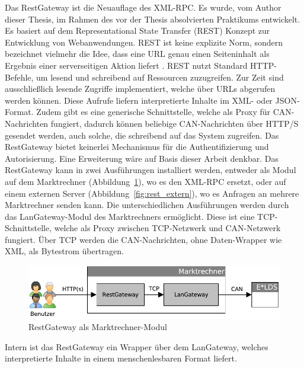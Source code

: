 \documentclass[11pt,a4paper]{report}
\begin{document}
Das RestGateway ist die Neuauflage des XML-RPC. Es wurde, vom Author dieser Thesis, im Rahmen des vor der Thesis absolvierten Praktikums entwickelt. Es basiert auf dem Representational State Transfer (REST) Konzept zur Entwicklung von Webanwendungen. REST ist keine explizite Norm, sondern bezeichnet vielmehr die Idee, dass eine URL genau einen Seiteninhalt als Ergebnis einer serverseitigen Aktion liefert \cite{wiki_rest}. REST nutzt Standard HTTP-Befehle, um lesend und schreibend auf Ressourcen zuzugreifen. Zur Zeit sind ausschließlich lesende Zugriffe implementiert, welche über URLs abgerufen werden können. Diese Aufrufe liefern interpretierte Inhalte im XML- oder JSON-Format. Zudem gibt es eine generische Schnittstelle, welche als Proxy für CAN-Nachrichten fungiert, dadurch können beliebige CAN-Nachrichten über HTTP/S gesendet werden, auch solche, die schreibend auf das System zugreifen. Das RestGateway bietet keinerlei Mechanismus für die Authentifizierung und Autorisierung. Eine Erweiterung wäre auf Basis dieser Arbeit denkbar. Das RestGateway kann in zwei Ausführungen installiert werden, entweder als Modul auf dem Marktrechner (Abbildung~\ref{fig:rest_intern}), wo es den XML-RPC ersetzt, oder auf einem externen Server (Abbildung~\ref{fig:rest_extern}), wo es Anfragen an mehrere Marktrechner senden kann. Die unterschiedlichen Ausführungen werden durch das LanGateway-Modul des Marktrechners ermöglicht. Diese ist eine TCP-Schnittstelle, welche als Proxy zwischen TCP-Netzwerk und CAN-Netzwerk fungiert. Über TCP werden die CAN-Nachrichten, ohne Daten-Wrapper wie XML, als Bytestrom übertragen.

\begin{figure}[htbp]
\centering
\includegraphics[scale=0.7]{images/RestGateway_intern.pdf}
\caption[]{RestGateway als Marktrechner-Modul}
\label{fig:rest_intern}
\end{figure}

Intern ist das RestGateway ein Wrapper über dem LanGateway, welches interpretierte Inhalte in einem menschenlesbaren Format liefert.
\end{document}

